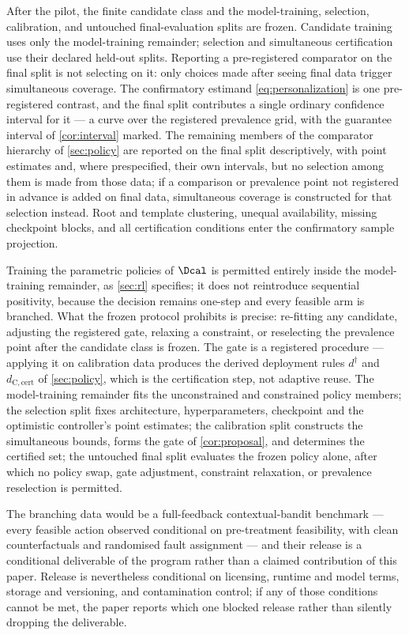 After the pilot, the finite candidate class and the model-training, selection,
calibration, and untouched final-evaluation splits are frozen.  Candidate
training uses only the model-training remainder; selection and simultaneous
certification use their declared held-out splits.  Reporting a pre-registered comparator on the
final split is not selecting on it: only choices made after seeing final data
trigger simultaneous coverage.  The confirmatory estimand \eqref{eq:personalization}
is one pre-registered contrast, and the final split contributes a single
ordinary confidence interval for it --- a curve over the registered prevalence
grid, with the guarantee interval of \cref{cor:interval} marked.  The remaining
members of the comparator hierarchy of \cref{sec:policy} are reported on the
final split descriptively, with point estimates and, where prespecified, their
own intervals, but no selection among them is made from those data; if a
comparison or prevalence point not registered in advance is added on final data,
simultaneous coverage is constructed for that selection instead.  Root and
template clustering, unequal availability, missing checkpoint blocks, and all
certification conditions enter the confirmatory sample projection.

Training the parametric policies of $\Dcal$ is permitted entirely inside the
model-training remainder, as \cref{sec:rl} specifies; it does not reintroduce sequential
positivity, because the decision remains one-step and every feasible arm is
branched.  What the frozen protocol prohibits is precise: re-fitting any
candidate, adjusting the registered gate, relaxing a constraint, or reselecting
the prevalence point after the candidate class is frozen.  The gate is a
registered procedure --- applying it on calibration data produces the derived
deployment rules $d^\dagger$ and $d_{\mathrm{C,cert}}$
of \cref{sec:policy}, which is the certification step, not adaptive reuse.  The
model-training remainder fits the unconstrained and constrained policy members; the selection split fixes architecture,
hyperparameters, checkpoint and the optimistic controller's point estimates; the
calibration split constructs the simultaneous bounds, forms the gate of
\cref{cor:proposal}, and determines the certified set; the untouched final split
evaluates the frozen policy alone, after which no policy swap, gate adjustment,
constraint relaxation, or prevalence reselection is permitted.

The branching data would be a full-feedback contextual-bandit benchmark ---
every feasible action observed conditional on pre-treatment feasibility, with
clean counterfactuals and randomised fault assignment --- and their release is a
conditional deliverable of the program rather than a claimed contribution of
this paper.  Release is nevertheless conditional on licensing, runtime and model
terms, storage and versioning, and contamination control; if any of those
conditions cannot be met, the paper reports which one blocked release rather
than silently dropping the deliverable.

